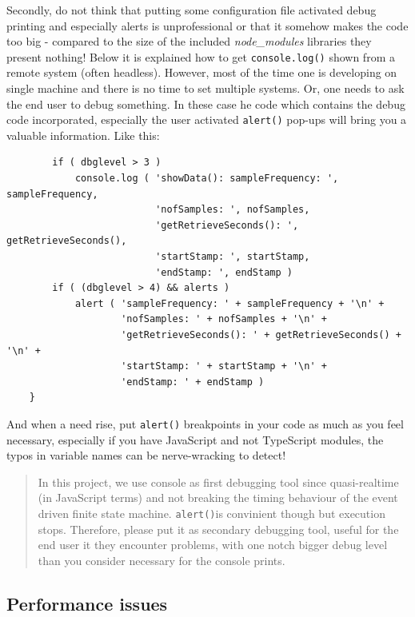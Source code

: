 \documentclass[11pt]{article}
\begin{document}
    Secondly, do not think that putting some configuration file activated
debug printing and especially alerts is unprofessional or that it
somehow makes the code too big - compared to the size of the included
\emph{node\_modules} libraries they present nothing! Below it is
explained how to get \texttt{console.log()} shown from a remote system
(often headless). However, most of the time one is developing on single
machine and there is no time to set multiple systems. Or, one needs to
ask the end user to debug something. In these case he code which
contains the debug code incorporated, especially the user activated
\texttt{alert()} pop-ups will bring you a valuable information. Like
this:

    \begin{verbatim}
        if ( dbglevel > 3 )
            console.log ( 'showData(): sampleFrequency: ', sampleFrequency,
                          'nofSamples: ', nofSamples,
                          'getRetrieveSeconds(): ', getRetrieveSeconds(),
                          'startStamp: ', startStamp,
                          'endStamp: ', endStamp )
        if ( (dbglevel > 4) && alerts )
            alert ( 'sampleFrequency: ' + sampleFrequency + '\n' +
                    'nofSamples: ' + nofSamples + '\n' +
                    'getRetrieveSeconds(): ' + getRetrieveSeconds() + '\n' +
                    'startStamp: ' + startStamp + '\n' +
                    'endStamp: ' + endStamp )
    }
\end{verbatim}

    And when a need rise, put \texttt{alert()} breakpoints in your code as
much as you feel necessary, especially if you have JavaScript and not
TypeScript modules, the typos in variable names can be nerve-wracking to
detect!

    \begin{quote}
In this project, we use console as first debugging tool since
quasi-realtime (in JavaScript terms) and not breaking the timing
behaviour of the event driven finite state machine. \texttt{alert()}is
convinient though but execution stops. Therefore, please put it as
secondary debugging tool, useful for the end user it they encounter
problems, with one notch bigger debug level than you consider necessary
for the console prints.
\end{quote}

    \hypertarget{performance-issues}{%
\subsection{Performance issues}\label{performance-issues}}
\end{document}
